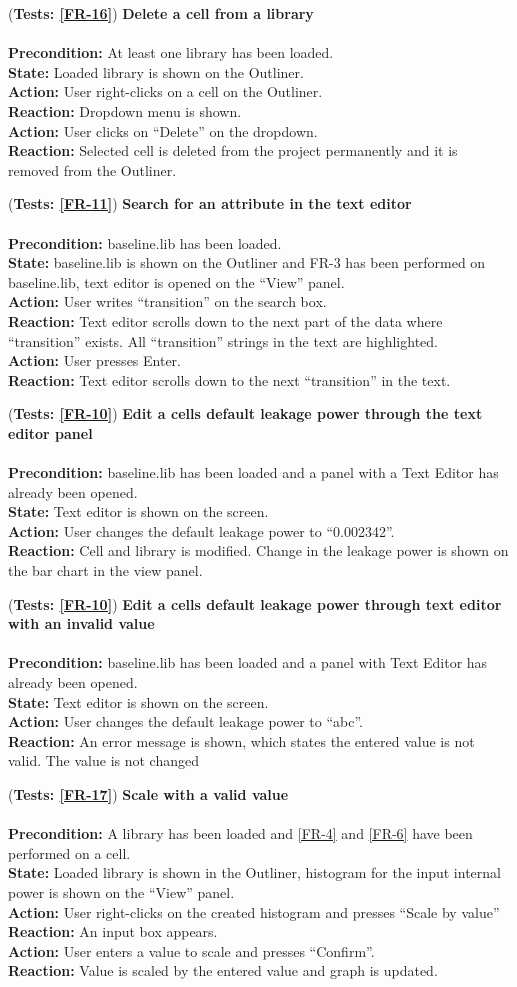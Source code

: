 \documentclass[10pt,a4paper]{report}
\newcommand{\precondition}[1]{
    \textbf{Precondition: } #1 \leavevmode \\
}
\newcommand{\action}[1]{
    \textbf{Action: } #1 \leavevmode \\
}
\newcommand{\state}[1]{
    \textbf{State: } #1 \leavevmode \\
}
\newcommand{\reaction}[1]{
    \textbf{Reaction: } #1 \leavevmode \\
}
\newcommand{\GTCDescription}[2]{
    (\textbf{Tests: #1}) \textbf{#2} \leavevmode \\
}
\begin{document}
\begin{GTC}
    \item \GTCDescription{\ref{FR-16}}{Delete a cell from a library} \leavevmode \\ \precondition{At least one library has been loaded.}\state{Loaded library is shown on the Outliner.}\action{User right-clicks on a cell on the Outliner.}\reaction{Dropdown menu is shown.}\action{User clicks on “Delete” on the dropdown.}\reaction{Selected cell is deleted from the project permanently and it is removed from the Outliner.
}
    
    \item \GTCDescription{\ref{FR-11}}{Search for an attribute in the text editor} \leavevmode \\ \precondition{ baseline.lib has been loaded.}\state{baseline.lib is shown on the Outliner and FR-3 has been performed on baseline.lib, text editor is opened on the “View” panel.}\action{User writes “transition” on the search box.}\reaction{Text editor scrolls down to the next part of the data where “transition” exists. All “transition” strings in the text are highlighted.}\action{User presses Enter.}\reaction{Text editor scrolls down to the next “transition” in the text.
}
    
    \item \GTCDescription{\ref{FR-10}}{Edit a cells default leakage power through the text editor panel} \leavevmode \\ \precondition{baseline.lib has been loaded and a panel with a Text Editor  has already been opened.}\state{Text editor is shown on the screen.}\action{User changes the default leakage power to “0.002342”.}\reaction{Cell and library is modified. Change in the leakage power is shown on the bar chart in the view panel.\label{GTC-35}
}
    
    \item \GTCDescription{\ref{FR-10}}{Edit a cells default leakage power through text editor with an invalid value} \leavevmode \\ \precondition{baseline.lib has been loaded and a panel with Text Editor has already been opened.}\state{Text editor is shown on the screen.}\action{User changes the default leakage power to “abc”.}\reaction{An error message is shown, which states the entered value is not valid. The value is not changed}
    
    \item \GTCDescription{\ref{FR-17}}{Scale with a valid value} \leavevmode \\ \precondition{A library has been loaded and \ref{FR-4} and \ref{FR-6} have been performed on a cell.}\state{Loaded library is shown in the Outliner, histogram for the input internal power is shown on the “View” panel.}\action{User right-clicks on the created histogram and presses “Scale by value”}\reaction{An input box appears.}\action{User enters a value to scale and presses “Confirm”.}\reaction{Value is scaled by the entered value and graph is updated.}
    

\end{GTC}
\end{document}
